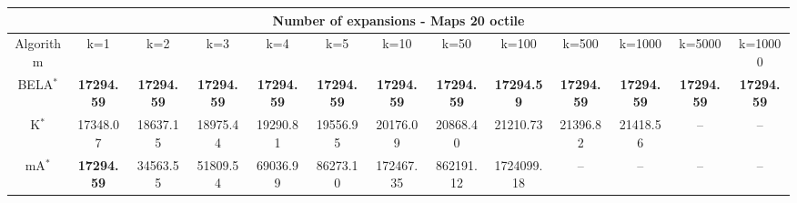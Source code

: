\begin{tabular}{c|cccccccccccc}\toprule
\multicolumn{13}{c}{Number of expansions - Maps 20 octile}\\ \midrule
Algorithm & k=1 & k=2 & k=3 & k=4 & k=5 & k=10 & k=50 & k=100 & k=500 & k=1000 & k=5000 & k=10000 \\ \midrule
BELA$^*$ & \textbf{17294.59} & \textbf{17294.59} & \textbf{17294.59} & \textbf{17294.59} & \textbf{17294.59} & \textbf{17294.59} & \textbf{17294.59} & \textbf{17294.59} & \textbf{17294.59} & \textbf{17294.59} & \textbf{17294.59} & \textbf{17294.59} \\
K$^*$ & 17348.07 & 18637.15 & 18975.44 & 19290.81 & 19556.95 & 20176.09 & 20868.40 & 21210.73 & 21396.82 & 21418.56 & -- & -- \\
mA$^*$ & \textbf{17294.59} & 34563.55 & 51809.54 & 69036.99 & 86273.10 & 172467.35 & 862191.12 & 1724099.18 & -- & -- & -- & -- \\ \bottomrule 
\end{tabular}
